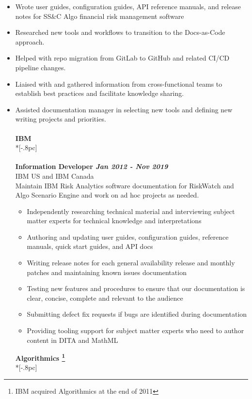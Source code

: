 \documentclass[11pt]{extarticle}
\begin{document}
\begin{itemize} 
\setlength{\itemsep}{0pt}
\item Wrote user guides, configuration guides, API reference manuals, and release notes for SS&C Algo financial risk management software
\item Researched new tools and workflows to transition to the Docs-as-Code approach.
\item Helped with repo migration from GitLab to GitHub and related CI/CD pipeline changes.
\item Liaised with and gathered information from cross-functional teams to establish best practices and facilitate knowledge sharing.
\item Assisted documentation manager in selecting new tools and defining new writing projects and priorities. \\
\\
{\large \bf IBM }  \\*[-.8pc]
\underline{\hspace{6.55in}} \\
\\
{\bf Information Developer \hfill \it Jan 2012 - Nov 2019}  \\
IBM US and IBM Canada \\
Maintain IBM Risk Analytics software documentation for RiskWatch and Algo Scenario Engine and work on ad hoc projects as needed. 
\begin{itemize} 
\setlength{\itemsep}{0pt}
\item Independently researching technical material and interviewing subject matter experts for technical knowledge and interpretations
  \item Authoring and updating user guides,  configuration guides, reference manuals, quick start guides, and API docs
  \item Writing release notes for each general availability release and monthly patches and maintaining known issues documentation 
  \item Testing new features and procedures to ensure that our documentation is clear, concise, complete and relevant to the audience
	\item Submitting defect fix requests if bugs are identified during documentation 
	\item Providing tooling support for subject matter experts who need to author content in DITA and MathML \\
\end{itemize}
{\large \bf Algorithmics \footnote {IBM acquired Algorithmics at the end of 2011}} \\*[-.8pc]

\end{itemize}
\end{document}
